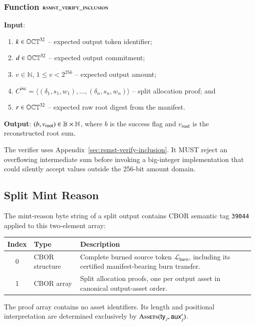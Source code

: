 \subsubsection{Function $\textsc{rsmst\_verify\_inclusion}$}\label{sec:rsmst-split-verify}

\textbf{Input}:
\begin{enumerate}
	\item $k \in \mathbb{OCT}^{32}$ -- expected output token identifier;
	\item $d \in \mathbb{OCT}^{32}$ -- expected output commitment;
	\item $v \in \mathbb{N}$, $1\leq v<2^{256}$ -- expected output amount;
	\item $C^\mathsf{inc}=\langle(\delta_1,s_1,w_1),\ldots,(\delta_n,s_n,w_n)\rangle$ -- split allocation proof; and
	\item $r \in \mathbb{OCT}^{32}$ -- expected raw root digest from the manifest.
\end{enumerate}

\textbf{Output}: $(b,v_\mathsf{root}) \in \mathbb{B}\times\mathbb{N}$, where $b$ is the success flag and $v_\mathsf{root}$ is the reconstructed root sum.

The verifier uses Appendix~\ref{sec:rsmst-verify-inclusion}.  It MUST reject an overflowing intermediate sum before invoking a big-integer implementation that could silently accept values outside the 256-bit amount domain.

\subsection{Split Mint Reason}\label{app:split-mint-reason}

The mint-reason byte string of a split output contains CBOR semantic tag \texttt{39044} applied to this two-element array:

\begin{longtable}{clp{9cm}}
\textbf{Index} & \textbf{Type} & \textbf{Description} \\
\hline
0 & CBOR structure & Complete burned source token $\mathcal{L}_\mathsf{burn}$, including its certified manifest-bearing burn transfer. \\
1 & CBOR array & Split allocation proofs, one per output asset in canonical output-asset order. \\
\end{longtable}

The proof array contains no asset identifiers. Its length and positional interpretation are determined exclusively by $\Call{Assets}{\mathsf{ty}_j,\auxd'_j}$.

